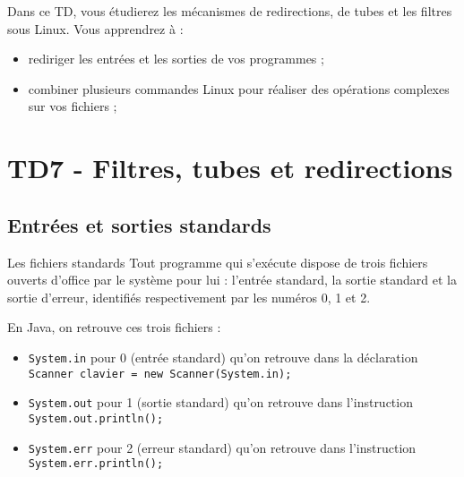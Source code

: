 \documentclass[a4paper,11pt]{article}
\date{2018 -- 2019}
\begin{document}
\entete
\titre
{}
\lastedit


	\begin{tcolorbox}[blanker,
	before skip=10mm,after skip=10mm,
	borderline west={1mm}{-4mm}{lightgray},
	title=Objectifs, coltitle=black, fonttitle=\sffamily\bfseries\large]
	Dans ce TD, vous étudierez les mécanismes de redirections, de tubes et les filtres sous Linux.
	Vous apprendrez à :
	\begin{itemize}
		\item rediriger les entrées et les sorties de vos programmes ;
		\item combiner plusieurs commandes Linux pour réaliser des opérations complexes sur vos fichiers ;
	\end{itemize}
	
	\end{tcolorbox}
	
	\tableofcontents

	\newpage


\section{TD7 - Filtres, tubes et redirections}
		
	\subsection{Entr\'ees et sorties standards}
	\begin{coltbox}{Les fichiers standards}
		Tout programme qui s'ex\'ecute dispose de trois fichiers ouverts d'office 
		par le syst\`eme pour lui : l'entr\'ee standard, la sortie standard et la sortie d'erreur,
		identifi\'es respectivement par les num\'eros 0, 1 et 2.
		\par
		En Java, on retrouve ces trois fichiers :
	   			
                  
			\begin{itemize}
				
				\item \verb_System.in_ pour 0 (entr\'ee standard) qu'on retrouve dans la d\'eclaration
					\verb_Scanner clavier = new Scanner(System.in);_
				\item \verb_System.out_ pour 1 (sortie standard) qu'on retrouve dans l'instruction
					\verb_System.out.println();_
				\item \verb_System.err_ pour 2 (erreur standard) qu'on retrouve dans l'instruction
						\verb_System.err.println();_
				\end{itemize}
	\end{coltbox}
	
\end{document}
